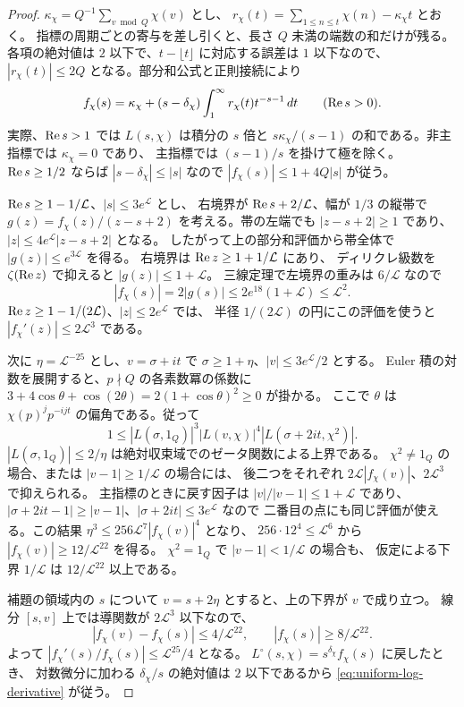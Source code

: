\begin{proof}
\(\kappa_\chi=Q^{-1}\sum_{v\bmod Q}\chi(v)\) とし、
\(r_\chi(t)=\sum_{1\le n\le t}\chi(n)-\kappa_\chi t\) とおく。
指標の周期ごとの寄与を差し引くと、長さ \(Q\) 未満の端数の和だけが残る。
各項の絶対値は \(2\) 以下で、\(t-\lfloor t\rfloor\) に対応する誤差は \(1\) 以下なので、
\(|r_\chi(t)|\le2Q\) となる。部分和公式と正則接続により
\[
 f_\chi(s)=\kappa_\chi+(s-\delta_\chi)
            \int_1^\infty r_\chi(t)t^{-s-1}\,dt
 \qquad(\operatorname{Re} s>0).
\]
実際、\(\operatorname{Re} s>1\) では \(L(s,\chi)\) は積分の \(s\) 倍と
\(s\kappa_\chi/(s-1)\) の和である。非主指標では \(\kappa_\chi=0\) であり、
主指標では \((s-1)/s\) を掛けて極を除く。
\(\operatorname{Re} s\ge1/2\) ならば \(|s-\delta_\chi|\le|s|\) なので
\(|f_\chi(s)|\le 1+4Q|s|\) が従う。

\(\operatorname{Re} s\ge1-1/\mathcal L\)、\(|s|\le3e^{\mathcal L}\) とし、
右境界が \(\operatorname{Re} s+2/\mathcal L\)、幅が \(1/3\) の縦帯で
\(g(z)=f_\chi(z)/(z-s+2)\) を考える。帯の左端でも
\(|z-s+2|\ge1\) であり、\(|z|\le4e^{\mathcal L}|z-s+2|\) となる。
したがって上の部分和評価から帯全体で \(|g(z)|\le e^{3\mathcal L}\) を得る。
右境界は \(\operatorname{Re} z\ge1+1/\mathcal L\) にあり、
ディリクレ級数を \(\zeta(\operatorname{Re} z)\) で抑えると \(|g(z)|\le1+\mathcal L\)。
三線定理で左境界の重みは \(6/\mathcal L\) なので
\[
 |f_\chi(s)|=2|g(s)|\le2e^{18}(1+\mathcal L)\le\mathcal L^2.
\]
\(\operatorname{Re} z\ge 1-1/(2\mathcal L)\)、\(|z|\le2e^\mathcal L\) では、
半径 \(1/(2\mathcal L)\) の円にこの評価を使うと
\(|f_\chi'(z)|\le2\mathcal L^3\) である。

次に \(\eta=\mathcal L^{-25}\) とし、\(v=\sigma+it\) で
\(\sigma\ge1+\eta\)、\(|v|\le3e^\mathcal L/2\) とする。
Euler 積の対数を展開すると、\(p\nmid Q\) の各素数冪の係数に
\(3+4\cos\theta+\cos(2\theta)=2(1+\cos\theta)^2\ge0\) が掛かる。
ここで \(\theta\) は \(\chi(p)^j p^{-ijt}\) の偏角である。従って
\[
 1\le |L(\sigma,1_Q)|^3 |L(v,\chi)|^4 |L(\sigma+2it,\chi^2)| .
\]
\(|L(\sigma,1_Q)|\le2/\eta\) は絶対収束域でのゼータ関数による上界である。
\(\chi^2\ne1_Q\) の場合、または \(|v-1|\ge1/\mathcal L\) の場合には、
後二つをそれぞれ \(2\mathcal L|f_\chi(v)|\)、\(2\mathcal L^3\) で抑えられる。
主指標のときに戻す因子は \(|v|/|v-1|\le1+\mathcal L\) であり、
\(|\sigma+2it-1|\ge|v-1|\)、\(|\sigma+2it|\le3e^\mathcal L\) なので
二番目の点にも同じ評価が使える。この結果
\(\eta^3\le256\mathcal L^7|f_\chi(v)|^4\) となり、
\(256\cdot12^4\le\mathcal L^6\) から
\(|f_\chi(v)|\ge12/\mathcal L^{22}\) を得る。
\(\chi^2=1_Q\) で \(|v-1|<1/\mathcal L\) の場合も、
仮定による下界 \(1/\mathcal L\) は \(12/\mathcal L^{22}\) 以上である。

補題の領域内の \(s\) について \(v=s+2\eta\) とすると、上の下界が \(v\) で成り立つ。
線分 \([s,v]\) 上では導関数が \(2\mathcal L^3\) 以下なので、
\[
 |f_\chi(v)-f_\chi(s)|\le4/\mathcal L^{22},
 \qquad |f_\chi(s)|\ge8/\mathcal L^{22}.
\]
よって \(|f_\chi'(s)/f_\chi(s)|\le\mathcal L^{25}/4\) となる。
\(L^\circ(s,\chi)=s^{\delta_\chi}f_\chi(s)\) に戻したとき、
対数微分に加わる \(\delta_\chi/s\) の絶対値は \(2\) 以下であるから
\eqref{eq:uniform-log-derivative} が従う。
\end{proof}

